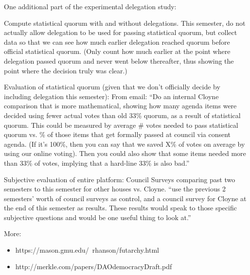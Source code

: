 \documentclass{sigchi}
\begin{document}
One additional part of the experimental delegation study:

Compute statistical quorum with and without delegations.
This semester, do not actually allow delegation to be used for passing statistical quorum, but collect data so that
we can see how much earlier delegation reached quorum before official statistical quorum.
(Only count how much earlier at the point where delegation passed quorum and never went below thereafter, thus
showing the point where the decision truly was clear.)

Evaluation of statistical quorum (given that we don't officially decide by including delegation this semester):
From email: ``Do an internal Cloyne comparison that is more mathematical, showing how many agenda items were decided
using fewer actual votes than old 33\% quorum, as a result of statistical quorum.
This could be measured by average \# votes needed to pass statistical quorum vs. \% of those items that get
formally passed at council via consent agenda.
(If it's 100\%, then you can say that we saved X\% of votes on
average by using our online voting).
Then you could also show that some items needed more than 33\% of votes, implying that a hard-line 33\% is also bad.'' 

Subjective evaluation of entire platform: Council Surveys comparing past two semesters to this semester for other
houses vs. Cloyne.
``use the previous 2 semesters' worth of council surveys as control, and a council survey for
Cloyne at the end of this semester as results.
These results would speak to those specific subjective questions
and would be one useful thing to look at.''




More:
\begin{itemize}
\item https://mason.gmu.edu/~rhanson/futarchy.html
\item http://merkle.com/papers/DAOdemocracyDraft.pdf
\end{itemize}
\end{document}
